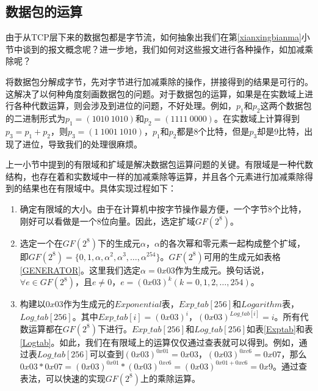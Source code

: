 \subsection{数据包的运算}
由于从TCP层下来的数据包都是字节流，如何抽象出我们在第\ref{xianxingbianma}小节中谈到的报文概念呢？进一步地，我们如何对这些报文进行各种操作，如加减乘除呢？
\par
将数据包分解成字节，先对字节进行加减乘除的操作，拼接得到的结果是可行的。这解决了以何种角度刻画数据包的问题。对于数据包的运算，如果是在实数域上进行各种代数运算，则会涉及到进位的问题，不好处理。例如，$p_{1}$和$p_{2}$这两个数据包的二进制形式为$p_{1}=\left(1010\ 1010\right)$和$p_{2}=\left(1111\ 0000\right)$。在实数域上计算得到$p_{3}=p_{1}+p_{2}$，则$p_{3}=\left(1\ 1001\ 1010\right)$，$p_{1}$和$p_{2}$都是8个比特，但是$p_{3}$却是$9$比特，出现了进位，导致我们的处理很麻烦。
\par
上一小节中提到的有限域和扩域是解决数据包运算问题的关键。有限域是一种代数结构，也存在着和实数域中一样的加减乘除等运算，并且各个元素进行加减乘除得到的结果也在有限域中。具体实现过程如下：
\begin{enumerate}[fullwidth,itemindent=2em,label=(\arabic*)]
	\item 确定有限域的大小。由于在计算机中按字节操作最方便，一个字节8个比特，刚好可以看做是一个8位向量。因此，选定扩域$GF\left(2^8\right)$。
	\item 选定一个在$GF\left(2^8\right)$下的生成元$\alpha$，$\alpha$的各次幂和零元素一起构成整个扩域，即$GF\left(2^8\right)=\{0,1,\alpha,\alpha^2,\alpha^3,\dots,\alpha^{254}\}$。$GF\left(2^8\right)$可用的生成元如表格\ref{GENERATOR}。这里我们选定$\alpha=0x03$作为生成元。换句话说，$\forall e \in GF\left(2^8\right) $，且$e \neq 0$，$e=\left(0x03\right)^{k}\left(k=0,1,2,\dots,254\right)$。
	\item 构建以$0x03$作为生成元的$Exponential$表，$Exp\_tab[256]$和$Logarithm$表，$Log\_tab[256]$。其中$Exp\_tab[i]=\left(0x03\right)^{i}$，$\left(0x03\right)^{Log\_tab[i]}=i$。所有代数运算都在$GF\left(2^8\right)$下进行。$Exp\_tab[256]$和$Log\_tab[256]$如表\ref{Exptab}和表\ref{Logtab}。如此，我们在有限域上的运算仅仅通过查表就可以得到。例如，通过表$Log\_tab[256]$可以查到$\left(0x03\right)^{0x01}=0x03$，$\left(0x03\right)^{0xc6}=0x07$，那么$0x03*0x07=\left(0x03\right)^{0x01}*\left(0x03\right)^{0xc6}=\left(0x03\right)^{0x01+0xc6}=0x9$。通过查表法，可以快速的实现$GF\left(2^8\right)$上的乘除运算。
\end{enumerate}
